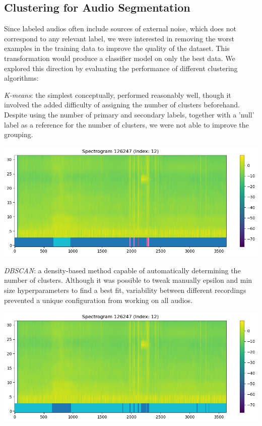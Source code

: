 \documentclass[11pt]{article}
\begin{document}
\subsection*{Clustering for Audio Segmentation}

Since labeled audios often include sources of external noise, which does not correspond to any relevant label, we were interested in removing the worst examples in the training data to improve the quality of the dataset. This transformation would produce a classifier model on only the best data. We explored this direction by evaluating the performance of different clustering algorithms:

\begin{minipage}{0.6\linewidth}
  \textit{K-means}: the simplest conceptually, performed reasonably well, though it involved the added difficulty of assigning the number of clusters beforehand. Despite using the number of primary and secondary labels, together with a 'null' label as a reference for the number of clusters, we were not able to improve the grouping.
\end{minipage}
\hfill
\begin{minipage}{0.35\linewidth}
  \includegraphics[width=\linewidth]{img/train_spectrogram_12_kmeans.png}
\end{minipage}

\vspace{1em}

\begin{minipage}{0.6\linewidth}
  \textit{DBSCAN}: a density-based method capable of automatically determining the number of clusters. Although it was possible to tweak manually epsilon and min size hyperparameters to find a best fit, variability between different recordings prevented a unique configuration from working on all audios.
\end{minipage}
\hfill
\begin{minipage}{0.35\linewidth}
  \includegraphics[width=\linewidth]{img/train_spectrogram_12_dbscan.png}
\end{minipage}
\end{document}
